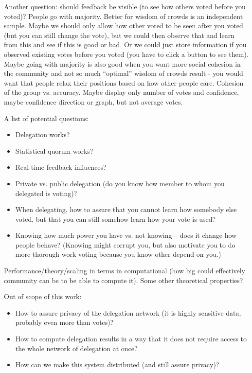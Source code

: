 \documentclass{sigchi}
\begin{document}
Another question: should feedback be visible (to see how others voted before you voted)?
People go with majority.
Better for wisdom of crowds is an independent sample.
Maybe we should only allow how other voted to be seen after you voted (but you can still change the vote),
but we could then observe that and learn from this and see if this is good or bad.
Or we could just store information if you observed existing votes before you voted (you have to click a button to see them).
Maybe going with majority is also good when you want more social cohesion in the community and not so much ``optimal''
wisdom of crowds result -  you would want that people relax their positions based on how other people care.
Cohesion of the group vs. accuracy.
Maybe display only number of votes and confidence, maybe confidence direction or graph, but not average votes.

A list of potential questions:
\begin{itemize}
\item Delegation works?
\item Statistical quorum works?
\item Real-time feedback influences?
\item Private vs. public delegation (do you know how member to whom you delegated is voting)?
\item When delegating, how to assure that you cannot learn how somebody else voted, but that you can still somehow
learn how your vote is used?
\item Knowing how much power you have vs. not knowing -- does it change how people behave? (Knowing might corrupt you, but also motivate you to do more thorough work voting because you know other depend on you.)
\end{itemize}

Performance/theory/scaling in terms in computational (how big could effectively community can be to be able to compute it).
Some other theoretical properties?

Out of scope of this work:

\begin{itemize}
\item How to assure privacy of the delegation network (it is highly sensitive data, probably even more than votes)?
\item How to compute delegation results in a way that it does not require access to the whole network of delegation at once?
\item How can we make this system distributed (and still assure privacy)?
\end{itemize}
\end{document}

